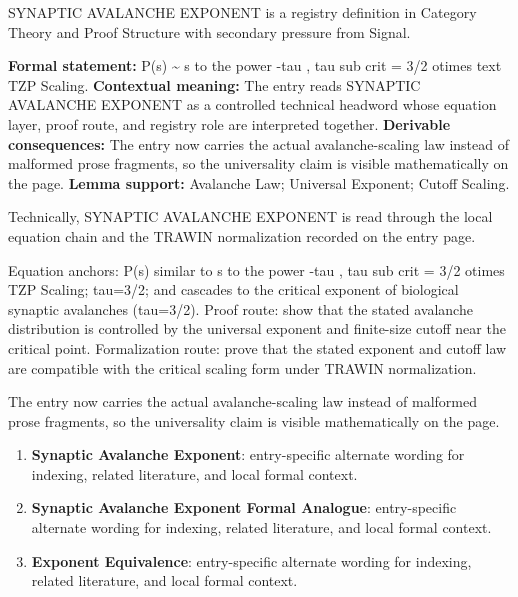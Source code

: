 
\begingroup\small
{}
SYNAPTIC AVALANCHE EXPONENT is a registry definition in Category Theory and Proof Structure with secondary pressure from Signal.

\begingroup\footnotesize\setlength{\emergencystretch}{3em}\sloppy
\textbf{Formal statement:} P(s) \textasciitilde{} s to the power -tau , tau sub crit = 3/2 otimes text TZP Scaling. \textbf{Contextual meaning:} The entry reads SYNAPTIC AVALANCHE EXPONENT as a controlled technical headword whose equation layer, proof route, and registry role are interpreted together. \textbf{Derivable consequences:} The entry now carries the actual avalanche-scaling law instead of malformed prose fragments, so the universality claim is visible mathematically on the page. \textbf{Lemma support:} Avalanche Law; Universal Exponent; Cutoff Scaling.\par
\endgroup

Technically, SYNAPTIC AVALANCHE EXPONENT is read through the local equation chain and the TRAWIN normalization recorded on the entry page.

Equation anchors: P(s) similar to s to the power -tau , tau sub crit = 3/2 otimes TZP Scaling; tau=3/2; and cascades to the critical exponent of biological synaptic avalanches (tau=3/2). Proof route: show that the stated avalanche distribution is controlled by the universal exponent and finite-size cutoff near the critical point. Formalization route: prove that the stated exponent and cutoff law are compatible with the critical scaling form under TRAWIN normalization.

The entry now carries the actual avalanche-scaling law instead of malformed prose fragments, so the universality claim is visible mathematically on the page.
\endgroup

\begin{enumerate}[leftmargin=1.6em,itemsep=6pt,topsep=4pt]
\item \textbf{Synaptic Avalanche Exponent}: entry-specific alternate wording for indexing, related literature, and local formal context.
\item \textbf{Synaptic Avalanche Exponent Formal Analogue}: entry-specific alternate wording for indexing, related literature, and local formal context.
\item \textbf{Exponent Equivalence}: entry-specific alternate wording for indexing, related literature, and local formal context.
\end{enumerate}

